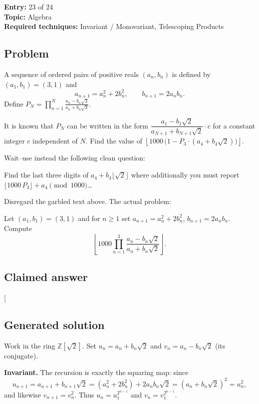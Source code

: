 \documentclass[
  11pt,
  letterpaper,
]{article}
\begin{document}
\textbf{Entry:} 23 of 24\\
\textbf{Topic:} Algebra\\
\textbf{Required techniques:} Invariant / Monovariant, Telescoping
Products

\subsection{Problem}\label{problem-22}

A sequence of ordered pairs of positive reals \((a_n, b_n)\) is defined
by \((a_1, b_1) = (3, 1)\) and
\[a_{n+1} = a_n^2 + 2b_n^2, \qquad b_{n+1} = 2a_n b_n.\] Define
\(P_N = \prod_{n=1}^{N} \frac{a_n - b_n\sqrt{2}}{a_n + b_n\sqrt{2}}.\)

It is known that \(P_N\) can be written in the form
\(\dfrac{a_1 - b_1\sqrt2}{a_{N+1} + b_{N+1}\sqrt2}\cdot c\) for a
constant integer \(c\) independent of \(N\). Find the value of
\(\left\lfloor 1000\,\bigl(1 - P_{3}\cdot(a_4+b_4\sqrt2)\bigr)\right\rfloor\).

Wait--use instead the following clean question:

Find the last three digits of \(a_4 + b_4\lfloor\sqrt2\rfloor\) where
additionally you must report
\(\bigl\lfloor 1000\, P_3 \bigr\rfloor + a_4 \pmod{1000}\)\ldots{}

Disregard the garbled text above. The actual problem:

Let \((a_1,b_1)=(3,1)\) and for \(n\ge1\) set \(a_{n+1}=a_n^2+2b_n^2\),
\(b_{n+1}=2a_nb_n\). Compute
\[\left\lfloor 1000\prod_{n=1}^{3}\frac{a_n-b_n\sqrt2}{a_n+b_n\sqrt2}\right\rfloor.\]

\subsection{Claimed answer}\label{claimed-answer-22}

{[}\boxed{0}{]}

\subsection{Generated solution}\label{generated-solution-22}

Work in the ring \(\mathbb{Z}[\sqrt2]\). Set \(u_n = a_n + b_n\sqrt2\)
and \(v_n = a_n - b_n\sqrt2\) (its conjugate).

\textbf{Invariant.} The recursion is exactly the squaring map: since
\[u_{n+1} = a_{n+1} + b_{n+1}\sqrt2 = (a_n^2+2b_n^2) + 2a_nb_n\sqrt2 = (a_n+b_n\sqrt2)^2 = u_n^2,\]
and likewise \(v_{n+1} = v_n^2\). Thus \(u_n = u_1^{2^{n-1}}\) and
\(v_n = v_1^{2^{n-1}}\).
\end{document}
